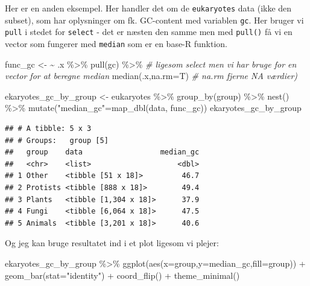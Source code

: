 \documentclass[
]{book}
\newenvironment{Shaded}{\begin{snugshade}}{\end{snugshade}}
\newcommand{\AttributeTok}[1]{\textcolor[rgb]{0.77,0.63,0.00}{#1}}
\newcommand{\CommentTok}[1]{\textcolor[rgb]{0.56,0.35,0.01}{\textit{#1}}}
\newcommand{\ErrorTok}[1]{\textcolor[rgb]{0.64,0.00,0.00}{\textbf{#1}}}
\newcommand{\FunctionTok}[1]{\textcolor[rgb]{0.00,0.00,0.00}{#1}}
\newcommand{\NormalTok}[1]{#1}
\newcommand{\OtherTok}[1]{\textcolor[rgb]{0.56,0.35,0.01}{#1}}
\newcommand{\SpecialCharTok}[1]{\textcolor[rgb]{0.00,0.00,0.00}{#1}}
\newcommand{\StringTok}[1]{\textcolor[rgb]{0.31,0.60,0.02}{#1}}
\begin{document}
Her er en anden eksempel. Her handler det om de \texttt{eukaryotes} data (ikke den subset), som har oplysninger om fk. GC-content med variablen \texttt{gc}. Her bruger vi \texttt{pull} i stedet for \texttt{select} - det er næsten den samme men med \texttt{pull()} få vi en vector som fungerer med \texttt{median} som er en base-R funktion.

\begin{Shaded}
\begin{Highlighting}[]
\NormalTok{func\_gc }\OtherTok{\textless{}{-}} \ErrorTok{\textasciitilde{}}\NormalTok{ .x }\SpecialCharTok{\%\textgreater{}\%} 
  \FunctionTok{pull}\NormalTok{(gc) }\SpecialCharTok{\%\textgreater{}\%}       \CommentTok{\# ligesom select men vi har bruge for en vector for at beregne median}
  \FunctionTok{median}\NormalTok{(.x,}\AttributeTok{na.rm=}\NormalTok{T) }\CommentTok{\# \textasciigrave{}na.rm\textasciigrave{} fjerne \textasciigrave{}NA\textasciigrave{} værdier)}

\NormalTok{ekaryotes\_gc\_by\_group }\OtherTok{\textless{}{-}}\NormalTok{ eukaryotes }\SpecialCharTok{\%\textgreater{}\%} 
  \FunctionTok{group\_by}\NormalTok{(group) }\SpecialCharTok{\%\textgreater{}\%} 
  \FunctionTok{nest}\NormalTok{() }\SpecialCharTok{\%\textgreater{}\%} 
  \FunctionTok{mutate}\NormalTok{(}\StringTok{"median\_gc"}\OtherTok{=}\FunctionTok{map\_dbl}\NormalTok{(data, func\_gc))}
\NormalTok{ekaryotes\_gc\_by\_group}
\end{Highlighting}
\end{Shaded}

\begin{verbatim}
## # A tibble: 5 x 3
## # Groups:   group [5]
##   group    data                  median_gc
##   <chr>    <list>                    <dbl>
## 1 Other    <tibble [51 x 18]>         46.7
## 2 Protists <tibble [888 x 18]>        49.4
## 3 Plants   <tibble [1,304 x 18]>      37.9
## 4 Fungi    <tibble [6,064 x 18]>      47.5
## 5 Animals  <tibble [3,201 x 18]>      40.6
\end{verbatim}

Og jeg kan bruge resultatet ind i et plot ligesom vi plejer:

\begin{Shaded}
\begin{Highlighting}[]
\NormalTok{ekaryotes\_gc\_by\_group }\SpecialCharTok{\%\textgreater{}\%} 
  \FunctionTok{ggplot}\NormalTok{(}\FunctionTok{aes}\NormalTok{(}\AttributeTok{x=}\NormalTok{group,}\AttributeTok{y=}\NormalTok{median\_gc,}\AttributeTok{fill=}\NormalTok{group)) }\SpecialCharTok{+} 
  \FunctionTok{geom\_bar}\NormalTok{(}\AttributeTok{stat=}\StringTok{"identity"}\NormalTok{) }\SpecialCharTok{+} 
  \FunctionTok{coord\_flip}\NormalTok{() }\SpecialCharTok{+}
  \FunctionTok{theme\_minimal}\NormalTok{() }
\end{Highlighting}
\end{Shaded}
\end{document}
